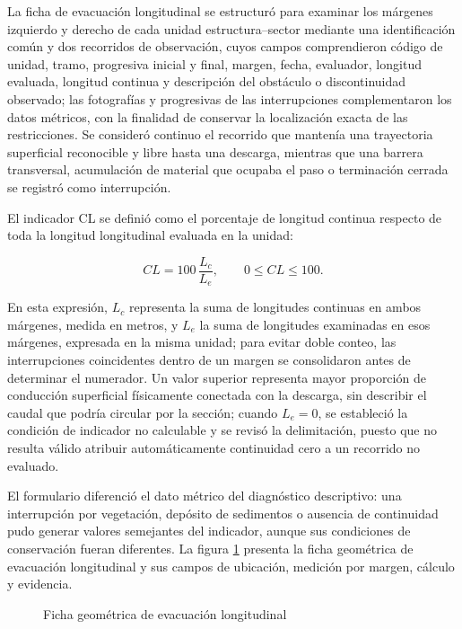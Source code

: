 
La ficha de evacuación longitudinal se estructuró para examinar los márgenes izquierdo y derecho de cada unidad estructura–sector mediante una identificación común y dos recorridos de observación, cuyos campos comprendieron código de unidad, tramo, progresiva inicial y final, margen, fecha, evaluador, longitud evaluada, longitud continua y descripción del obstáculo o discontinuidad observado; las fotografías y progresivas de las interrupciones complementaron los datos métricos, con la finalidad de conservar la localización exacta de las restricciones. Se consideró continuo el recorrido que mantenía una trayectoria superficial reconocible y libre hasta una descarga, mientras que una barrera transversal, acumulación de material que ocupaba el paso o terminación cerrada se registró como interrupción.

El indicador CL se definió como el porcentaje de longitud continua respecto de toda la longitud longitudinal evaluada en la unidad:

\[
CL=100\,\frac{L_c}{L_e},\qquad 0\leq CL\leq 100.
\]

En esta expresión, \(L_c\) representa la suma de longitudes continuas en ambos márgenes, medida en metros, y \(L_e\) la suma de longitudes examinadas en esos márgenes, expresada en la misma unidad; para evitar doble conteo, las interrupciones coincidentes dentro de un margen se consolidaron antes de determinar el numerador. Un valor superior representa mayor proporción de conducción superficial físicamente conectada con la descarga, sin describir el caudal que podría circular por la sección; cuando \(L_e=0\), se estableció la condición de indicador no calculable y se revisó la delimitación, puesto que no resulta válido atribuir automáticamente continuidad cero a un recorrido no evaluado.

El formulario diferenció el dato métrico del diagnóstico descriptivo: una interrupción por vegetación, depósito de sedimentos o ausencia de continuidad pudo generar valores semejantes del indicador, aunque sus condiciones de conservación fueran diferentes. La figura \ref{fig:ficha-longitudinal} presenta la ficha geométrica de evacuación longitudinal y sus campos de ubicación, medición por margen, cálculo y evidencia.

\begin{figure}[p]
\centering
\caption{Ficha geométrica de evacuación longitudinal}
\label{fig:ficha-longitudinal}
\begin{minipage}{0.95\linewidth}

\end{minipage}
\end{figure}

